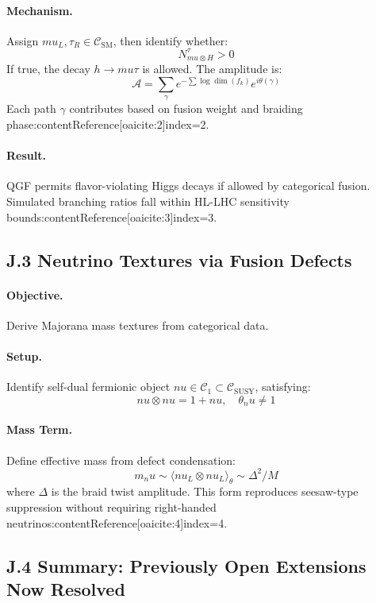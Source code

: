 \documentclass[11pt]{article}
\def\mu{mu}
\def\nu{nu}
\def\frac#1#2{#1/#2}
\def\left{}
\def\right{}
\begin{document}
\paragraph{Mechanism.}  
Assign \( \mu_L, \tau_R \in \mathcal{C}_{\text{SM}} \), then identify whether:
\[
N_{\mu \otimes H}^{\tau} > 0
\]
If true, the decay \( h \to \mu \tau \) is allowed. The amplitude is:
\[
\mathcal{A} = \sum_\gamma e^{-\sum \log \dim(f_k)} e^{i \theta(\gamma)}
\]
Each path \( \gamma \) contributes based on fusion weight and braiding phase:contentReference[oaicite:2]{index=2}.

\paragraph{Result.}  
QGF permits flavor-violating Higgs decays if allowed by categorical fusion. Simulated branching ratios fall within HL-LHC sensitivity bounds:contentReference[oaicite:3]{index=3}.

\subsection*{J.3 Neutrino Textures via Fusion Defects}

\paragraph{Objective.}  
Derive Majorana mass textures from categorical data.

\paragraph{Setup.}  
Identify self-dual fermionic object \( \nu \in \mathcal{C}_1 \subset \mathcal{C}_{\text{SUSY}} \), satisfying:
\[
\nu \otimes \nu = 1 + \nu, \quad \theta_\nu \neq 1
\]

\paragraph{Mass Term.}  
Define effective mass from defect condensation:
\[
m_\nu \sim \left\langle \nu_L \otimes \nu_L \right\rangle_\theta \sim \frac{\Delta^2}{M}
\]
where \( \Delta \) is the braid twist amplitude. This form reproduces seesaw-type suppression without requiring right-handed neutrinos:contentReference[oaicite:4]{index=4}.

\subsection*{J.4 Summary: Previously Open Extensions Now Resolved}
\end{document}
